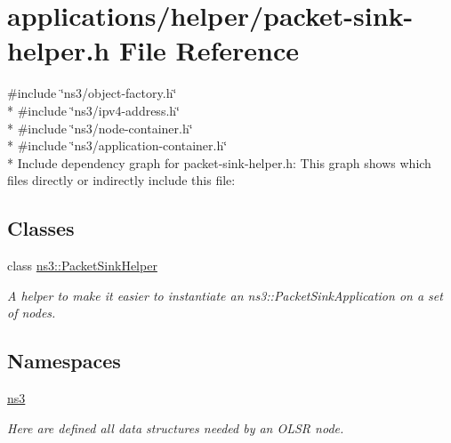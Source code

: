 \hypertarget{packet-sink-helper_8h}{}\section{applications/helper/packet-\/sink-\/helper.h File Reference}
\label{packet-sink-helper_8h}
{\ttfamily \#include \char`\"{}ns3/object-\/factory.\+h\char`\"{}}\\*
{\ttfamily \#include \char`\"{}ns3/ipv4-\/address.\+h\char`\"{}}\\*
{\ttfamily \#include \char`\"{}ns3/node-\/container.\+h\char`\"{}}\\*
{\ttfamily \#include \char`\"{}ns3/application-\/container.\+h\char`\"{}}\\*
Include dependency graph for packet-\/sink-\/helper.h\+:
This graph shows which files directly or indirectly include this file\+:
\subsection*{Classes}
\begin{DoxyCompactItemize}
\item 
class \hyperlink{classns3_1_1PacketSinkHelper}{ns3\+::\+Packet\+Sink\+Helper}
\begin{DoxyCompactList}\small\item\em A helper to make it easier to instantiate an ns3\+::\+Packet\+Sink\+Application on a set of nodes. \end{DoxyCompactList}\end{DoxyCompactItemize}
\subsection*{Namespaces}
\begin{DoxyCompactItemize}
\item 
 \hyperlink{namespacens3}{ns3}
\begin{DoxyCompactList}\small\item\em Here are defined all data structures needed by an O\+L\+SR node. \end{DoxyCompactList}\end{DoxyCompactItemize}

